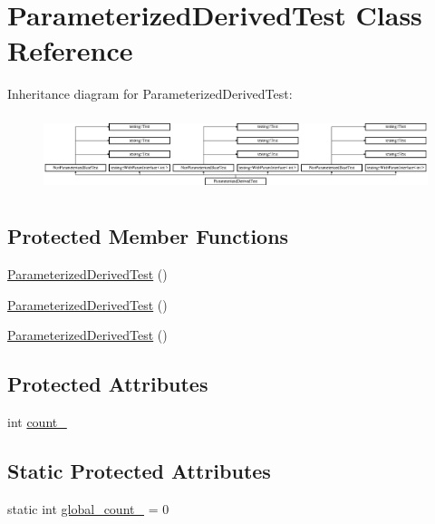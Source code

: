 \hypertarget{class_parameterized_derived_test}{}\section{Parameterized\+Derived\+Test Class Reference}
\label{class_parameterized_derived_test}
Inheritance diagram for Parameterized\+Derived\+Test\+:\begin{figure}[H]
\begin{center}
\leavevmode
\includegraphics[height=2.232855cm]{d2/d9e/class_parameterized_derived_test}
\end{center}
\end{figure}
\subsection*{Protected Member Functions}
\begin{DoxyCompactItemize}
\item 
\mbox{\hyperlink{class_parameterized_derived_test_a5fb176948a078a3754df7b9939568c78}{Parameterized\+Derived\+Test}} ()
\item 
\mbox{\hyperlink{class_parameterized_derived_test_a5fb176948a078a3754df7b9939568c78}{Parameterized\+Derived\+Test}} ()
\item 
\mbox{\hyperlink{class_parameterized_derived_test_a5fb176948a078a3754df7b9939568c78}{Parameterized\+Derived\+Test}} ()
\end{DoxyCompactItemize}
\subsection*{Protected Attributes}
\begin{DoxyCompactItemize}
\item 
int \mbox{\hyperlink{class_parameterized_derived_test_ad8a2968265e7477c13585d17bbd0492c}{count\+\_\+}}
\end{DoxyCompactItemize}
\subsection*{Static Protected Attributes}
\begin{DoxyCompactItemize}
\item 
static int \mbox{\hyperlink{class_parameterized_derived_test_ab6c067a099764a9d58b5f2e8ebcb5d0f}{global\+\_\+count\+\_\+}} = 0
\end{DoxyCompactItemize}
